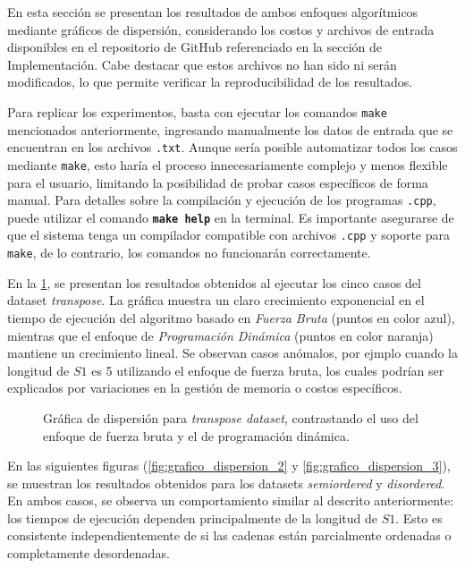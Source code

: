 En esta sección se presentan los resultados de ambos enfoques algorítmicos mediante gráficos de dispersión, considerando los costos y archivos de entrada disponibles en el repositorio de GitHub referenciado en la sección de Implementación. Cabe destacar que estos archivos no han sido ni serán modificados, lo que permite verificar la reproducibilidad de los resultados.

Para replicar los experimentos, basta con ejecutar los comandos \texttt{make} mencionados anteriormente, ingresando manualmente los datos de entrada que se encuentran en los archivos \texttt{.txt}. Aunque sería posible automatizar todos los casos mediante \texttt{make}, esto haría el proceso innecesariamente complejo y menos flexible para el usuario, limitando la posibilidad de probar casos específicos de forma manual. Para detalles sobre la compilación y ejecución de los programas \texttt{.cpp}, puede utilizar el comando \textbf{\texttt{make help}} en la terminal. Es importante asegurarse de que el sistema tenga un compilador compatible con archivos \texttt{.cpp} y soporte para \texttt{make}, de lo contrario, los comandos no funcionarán correctamente.

En la \cref{fig:grafico_dispersion_1}, se presentan los resultados obtenidos al ejecutar los cinco casos del dataset \textit{transpose}. La gráfica muestra un claro crecimiento exponencial en el tiempo de ejecución del algoritmo basado en \textit{Fuerza Bruta} (puntos en color azul), mientras que el enfoque de \textit{Programación Dinámica} (puntos en color naranja) mantiene un crecimiento lineal. Se observan casos anómalos, por ejmplo cuando la longitud de \( S1 \) es 5 utilizando el enfoque de fuerza bruta, los cuales podrían ser explicados por variaciones en la gestión de memoria o costos específicos.

\begin{figure}[H]
    \centering
    
    \caption{Gráfica de dispersión para \textit{transpose dataset}, contrastando el uso del enfoque de fuerza bruta y el de programación dinámica.}
    \label{fig:grafico_dispersion_1}
\end{figure}

En las siguientes figuras (\cref{fig:grafico_dispersion_2} y \cref{fig:grafico_dispersion_3}), se muestran los resultados obtenidos para los datasets \textit{semiordered} y \textit{disordered}. En ambos casos, se observa un comportamiento similar al descrito anteriormente: los tiempos de ejecución dependen principalmente de la longitud de \( S1 \). Esto es consistente independientemente de si las cadenas están parcialmente ordenadas o completamente desordenadas. 

